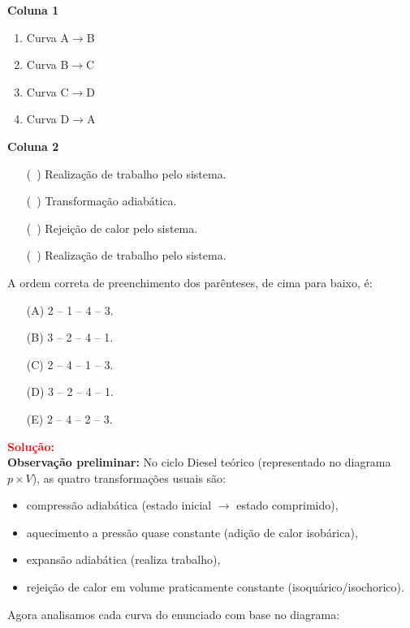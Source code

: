 \begin{flushleft}
\noindent
\textbf{Coluna 1}
\begin{enumerate}
\item Curva A$\to$B
\item Curva B$\to$C
\item Curva C$\to$D
\item Curva D$\to$A
\end{enumerate}

\noindent
\textbf{Coluna 2}
\begin{itemize}
\item[(\ )] Realiza\c{c}\~ao de trabalho pelo sistema.
\item[(\ )] Transformação adiabática.
\item[(\ )] Rejei\c{c}\~ao de calor pelo sistema.
\item[(\ )] Realiza\c{c}\~ao de trabalho pelo sistema.
\end{itemize}

A ordem correta de preenchimento dos par\^enteses, de cima para baixo, \'e:

\begin{itemize}
\item[(A)] 2 -- 1 -- 4 -- 3.
\item[(B)] 3 -- 2 -- 4 -- 1.
\item[(C)] 2 -- 4 -- 1 -- 3.
\item[(D)] 3 -- 2 -- 4 -- 1.
\item[(E)] 2 -- 4 -- 2 -- 3.
\end{itemize}

\vspace{0.5cm}

\textcolor{red}{\textbf{Solução:}}\\

\textbf{Observação preliminar:} No ciclo Diesel teórico (representado no diagrama $p\times V$), as quatro transformações usuais s\~ao:
\begin{itemize}
    \item compress\~ao adiab\'atica (estado inicial $\to$ estado comprimido),
    \item aquecimento a press\~ao quase constante (adi\c{c}\~ao de calor isob\'arica),
    \item expans\~ao adiab\'atica (realiza trabalho),
    \item rejei\c{c}\~ao de calor em volume praticamente constante (isoqu\'arico/isochorico).
\end{itemize}

Agora analisamos cada curva do enunciado com base no diagrama:


\end{flushleft}
